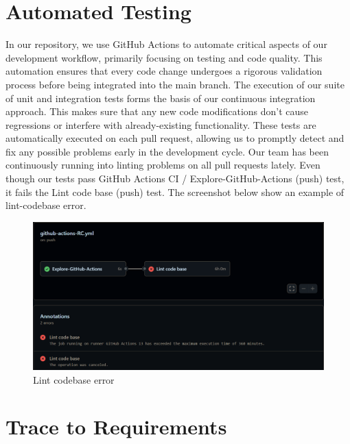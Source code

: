 \documentclass[12pt, titlepage]{article}
\begin{document}

\section{Automated Testing}

In our repository, we use GitHub Actions to automate critical aspects of our development workflow, primarily focusing on testing and code quality. This automation ensures that every code change undergoes a rigorous validation process before being integrated into the main branch. The execution of our suite of unit and integration tests forms the basis of our continuous integration approach. This makes sure that any new code modifications don't cause regressions or interfere with already-existing functionality. These tests are automatically executed on each pull request, allowing us to promptly detect and fix any possible problems early in the development cycle. Our team has been continuously running into linting problems on all pull requests lately. Even though our tests pass GitHub Actions CI / Explore-GitHub-Actions (push) test, it fails the Lint code base (push) test. The screenshot below show an example of lint-codebase error.

\begin{figure}[h]
  \centering
  \includegraphics[width=1\textwidth]{lint_codebase_error.png}
  \caption{Lint codebase error}
\end{figure}

\section{Trace to Requirements}
\end{document}
